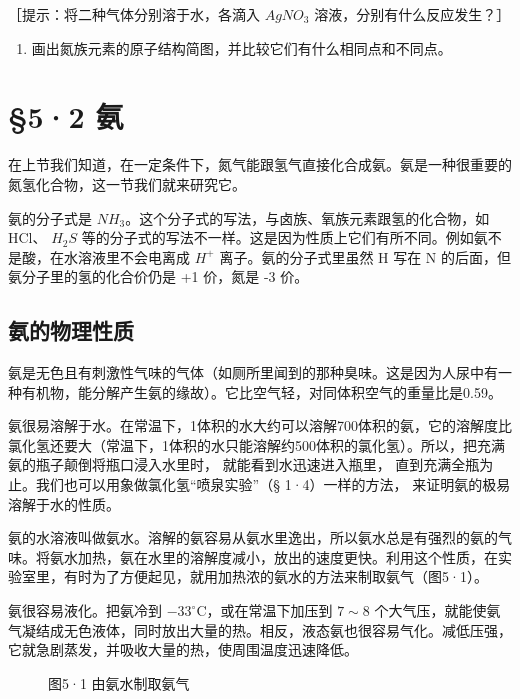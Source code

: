 ［提示：将二种气体分别溶于水，各滴入 \(AgNO_{3}\)
溶液，分别有什么反应发生？］

\begin{enumerate}[start=7]
\item
  画出氮族元素的原子结构简图，并比较它们有什么相同点和不同点。
\end{enumerate}

\section{§5·2 氨}

在上节我们知道，在一定条件下，氮气能跟氢气直接化合成氨。氨是一种很重要的氮氢化合物，这一节我们就来研究它。

氨的分子式是
\(NH_{3}\)。这个分子式的写法，与卤族、氧族元素跟氢的化合物，如 HCl、
\(H_{2}S\)
等的分子式的写法不一样。这是因为性质上它们有所不同。例如氨不是酸，在水溶液里不会电离成
\(H^{+}\) 离子。氨的分子式里虽然 H 写在 N
的后面，但氨分子里的氢的化合价仍是 +1 价，氮是 -3 价。

\subsection{氨的物理性质}

氨是无色且有刺激性气味的气体（如厕所里闻到的那种臭味。这是因为人尿中有一种有机物，能分解产生氨的缘故）。它比空气轻，对同体积空气的重量比是0.59。

氨很易溶解于水。在常温下，1体积的水大约可以溶解700体积的氨，它的溶解度比氯化氢还要大（常温下，1体积的水只能溶解约500体积的氯化氢）。所以，把充满氨的瓶子颠倒将瓶口浸入水里时，
就能看到水迅速进入瓶里，
直到充满全瓶为止。我们也可以用象做氯化氢``喷泉实验''（§
1·4）一样的方法， 来证明氨的极易溶解于水的性质。

氨的水溶液叫做氨水。溶解的氨容易从氨水里逸出，所以氨水总是有强烈的氨的气味。将氨水加热，氨在水里的溶解度减小，放出的速度更快。利用这个性质，在实验室里，有时为了方便起见，就用加热浓的氨水的方法来制取氨气（图5·1）。

氨很容易液化。把氨冷到 \(-33^{\circ}\mathrm{C}\)，或在常温下加压到
\(7 \sim 8\)
个大气压，就能使氨气凝结成无色液体，同时放出大量的热。相反，液态氨也很容易气化。减低压强，它就急剧蒸发，并吸收大量的热，使周围温度迅速降低。

\begin{figure}
\centering
\caption{图5·1 由氨水制取氨气}
\end{figure}

